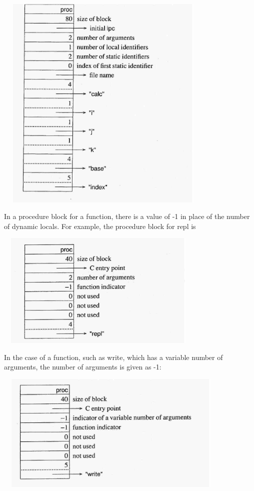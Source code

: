 \ \  \includegraphics[width=3.848in,height=4.1307in]{ib-img/ib-img123.jpg} 


In a procedure block for a function, there is a value of -1 in place
of the number of dynamic locals. For example, the procedure block for
repl is


\ \  \includegraphics[width=3.6335in,height=2.1866in]{ib-img/ib-img124.jpg} 


In the case of a function, such as write, which has a variable number
of arguments, the number of arguments is given as -1:


\ \  \includegraphics[width=4.1681in,height=2.248in]{ib-img/ib-img125.jpg} 


